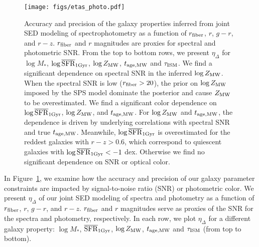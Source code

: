\begin{figure}
\begin{center}
    \texttt{[image: figs/etas\_photo.pdf]}
    \caption{
        Accuracy and precision of the galaxy properties inferred from joint SED
        modeling of spectrophotometry as a function of $r_{\rm fiber}$, $r$,
        $g-r$, and $r-z$.
        $r_{\rm fiber}$ and $r$ magnitudes are proxies for spectral and
        photometric SNR. 
        From the top to bottom rows, we present $\eta_\Delta$ for $\log M_*$,
        $\log\overline{\rm SFR}_{\rm 1Gyr}$, $\log Z_{\rm MW}$, $t_{\rm age, MW}$ and 
        $\tau_{\rm ISM}$.
        We find a significant dependence on spectral SNR in the inferred 
        $\log Z_{\rm MW}$. 
        When the spectral SNR is low ($r_{\rm fiber} > 20$), the prior on 
        $\log Z_{\rm MW}$ imposed by the SPS model dominate the posterior and
        cause $Z_{\rm MW}$ to be overestimated. 
        We find a significant color dependence on $\log\overline{\rm SFR}_{\rm 1Gyr}$, $\log Z_{\rm
        MW}$, and $t_{\rm age, MW}$. 
        For $\log Z_{\rm MW}$ and $t_{\rm age, MW}$, the dependence is driven by underlying
        correlations with spectral SNR and true $t_{\rm age, MW}$. 
        Meanwhile, $\log\overline{\rm SFR}_{\rm 1Gyr}$ is overestimated for the reddest galaxies with
        $r - z > 0.6$, which correspond to quiescent galaxies with $\log\overline{\rm SFR}_{\rm 1Gyr}
        < -1$ dex. 
        Otherwise we find no significant dependence on SNR or optical color. 
    }    
    \label{fig:eta_photo}
\end{center}
\end{figure}

In Figure~\ref{fig:eta_photo}, we examine how the accuracy and precision of
our galaxy parameter constraints are impacted by signal-to-noise ratio (SNR) or
photometric color. 
We present $\eta_\Delta$ of our joint SED modeling of spectra and photometry as
a function of $r_{\rm fiber}$, $r$, $g-r$, and $r-z$. 
$r_{\rm fiber}$ and $r$ magnitudes serve as proxies of the SNR for the spectra
and photometry, respectively. 
In each row, we plot $\eta_\Delta$ for a different galaxy property: $\log M_*$,
$\overline{\rm SFR}_{\rm 1Gyr}$, $\log Z_{\rm MW}$, $t_{\rm age, MW}$ and $\tau_{\rm ISM}$ (from top to bottom).

